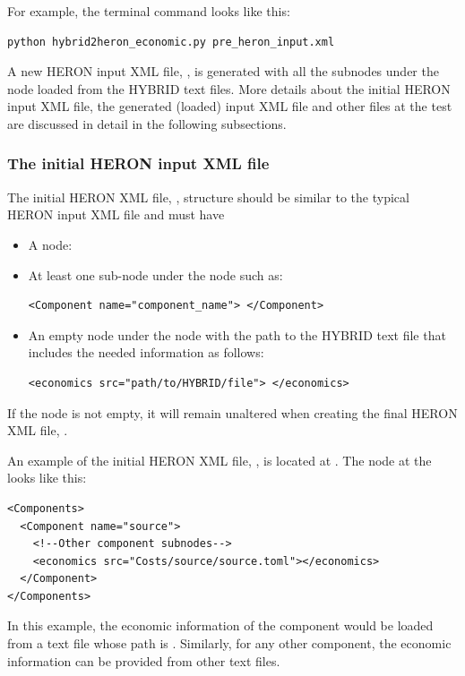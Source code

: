 For example, the terminal command looks like this:
\begin{lstlisting}
python hybrid2heron_economic.py pre_heron_input.xml
\end{lstlisting}
A new HERON input XML file, , is generated with all the subnodes under the  node loaded from the HYBRID text files. More details about the initial HERON input XML file, the generated (loaded) input XML file and other files at the  test are discussed in detail in the following subsections.

\subsubsection{The initial HERON input XML file}
The initial HERON XML file, , structure should be similar to the typical HERON input XML file and must have
\begin{itemize}
\item A  node:
\item At least one  sub-node under the  node such as:
\begin{lstlisting}[style=XML,morekeywords={class}]
<Component name="component_name"> </Component>
\end{lstlisting}

\item An empty  node under the  node with the path to the HYBRID text file that includes the needed information as follows:
\begin{lstlisting}[style=XML,morekeywords={class}]
<economics src="path/to/HYBRID/file"> </economics>
\end{lstlisting}
\end{itemize}
If the  node is not empty, it will remain unaltered when creating the final HERON XML file, .

An example of the initial HERON XML file, , is located at .
The  node at the  looks like this:
\begin{lstlisting}[style=XML,morekeywords={class}]
<Components>
  <Component name="source">
    <!--Other component subnodes-->
    <economics src="Costs/source/source.toml"></economics>
  </Component>
</Components>
\end{lstlisting}
In this example, the economic information of the component  would be loaded from a text file whose path is . Similarly, for any other component, the economic information can be provided from other text files.

